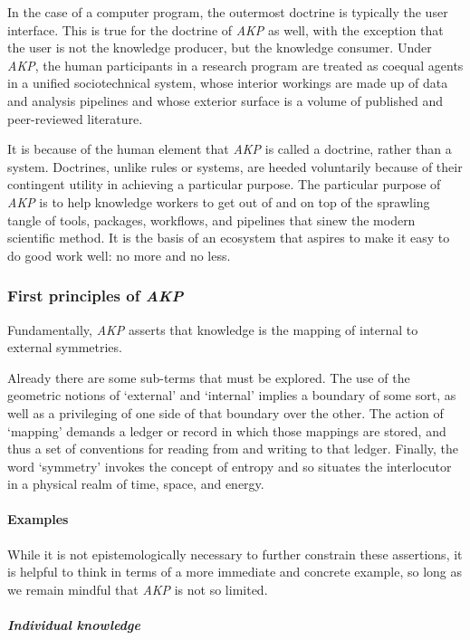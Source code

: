\documentclass[a4paper,11pt,oneside]{book}
\begin{document}
In the case of a computer program, the outermost doctrine is typically the user interface. This is true for the doctrine of \textit{AKP} as well, with the exception that the user is not the knowledge producer, but the knowledge consumer. Under \textit{AKP}, the human participants in a research program are treated as coequal agents in a unified sociotechnical system, whose interior workings are made up of data and analysis pipelines and whose exterior surface is a volume of published and peer-reviewed literature.

It is because of the human element that \textit{AKP} is called a doctrine, rather than a system. Doctrines, unlike rules or systems, are heeded voluntarily because of their contingent utility in achieving a particular purpose. The particular purpose of \textit{AKP} is to help knowledge workers to get out of and on top of the sprawling tangle of tools, packages, workflows, and pipelines that sinew the modern scientific method. It is the basis of an ecosystem that aspires to make it easy to do good work well: no more and no less.

\subsubsection{First principles of \textit{AKP}}

Fundamentally, \textit{AKP} asserts that knowledge is the mapping of internal to external symmetries.

Already there are some sub-terms that must be explored. The use of the geometric notions of `external' and `internal' implies a boundary of some sort, as well as a privileging of one side of that boundary over the other. The action of `mapping' demands a ledger or record in which those mappings are stored, and thus a set of conventions for reading from and writing to that ledger. Finally, the word `symmetry' invokes the concept of entropy and so situates the interlocutor in a physical realm of time, space, and energy.

\paragraph{Examples}

While it is not epistemologically necessary to further constrain these assertions, it is helpful to think in terms of a more immediate and concrete example, so long as we remain mindful that \textit{AKP} is not so limited.

\subparagraph{Individual knowledge}
\end{document}
